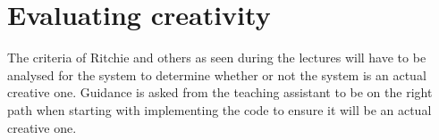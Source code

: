 
\section{Evaluating creativity}
\label{sec:creativity}

The criteria of Ritchie and others as seen during the lectures will have to be analysed for the system to determine whether or not the system is an actual creative one.
Guidance is asked from the teaching assistant to be on the right path when starting with implementing the code to ensure it will be an actual creative one.